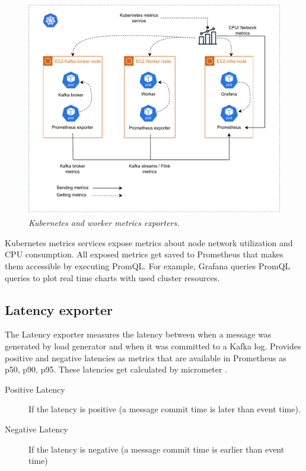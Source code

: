 \begin{figure}[ht]
    \centering
    \includegraphics[width=1\textwidth]{figures/metrics-collection}
    \caption{\textit{Kubernetes and worker metrics exporters.}}
    \label{fig:metrics-collection}
\end{figure}

Kubernetes metrics services expose metrics about node network utilization and CPU consumption.
All exposed metrics get saved to Prometheus that makes them accessible by executing PromQL.
For example, Grafana queries PromQL queries to plot real time charts with used cluster resources.

\subsection{Latency exporter}\label{subsec:latency-exporter}
The Latency exporter measures the latency between when a message was generated by load generator and when
it was committed to a Kafka log.
Provides positive and negative latencies as metrics that are available in Prometheus as p50, p90, p95.
These latencies get calculated by micrometer \cite{micrometer}.

\begin{description}
    \item[Positive Latency] If the latency is positive (a message commit time is later than event time).
    \item[Negative Latency] If the latency is negative (a message commit time is earlier than event time)
\end{description}


